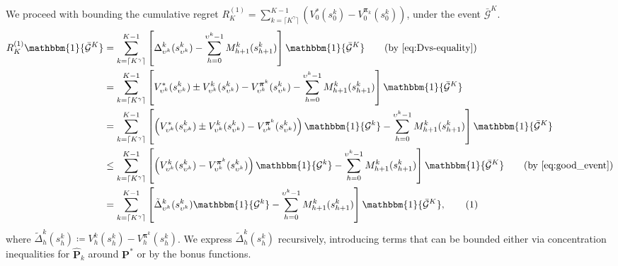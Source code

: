 \documentclass[11pt]{article}
\newcommand{\pii}{\boldsymbol{\pi}}
\newcommand{\pp}{\boldsymbol{P}}
\newcommand{\Dvs}{\Delta}
\newcommand{\Dvk}{\tilde{\Delta}}
\newcommand{\Dvsm}{M}
\newcommand\numberthis{\addtocounter{equation}{1}\tag{\theequation}}
\begin{document}
We proceed with bounding the cumulative regret $R_K^{(1)} = \sum_{k=\lceil K^\gamma\rceil}^{K-1} \left(V_0^{*}(s_0^k) - V_0^{\pii_k}(s_0^k)\right)$, under the event $\bar{\mathcal{G}}^K$.
\begin{align*}
    R_K^{(1)} \mathbbm{1}\{\bar{\mathcal{G}}^K\} 
    &= \sum_{k=\lceil K^\gamma\rceil}^{K-1}\left[\Dvs^k_{\upsilon^k}(s_{\upsilon^k}^k) - \sum_{h=0}^{{\upsilon^k}-1}\Dvsm^k_{h+1}(s_{h+1}^k)\right]\mathbbm{1}\{\bar{\mathcal{G}}^K\} \tag{by \eqref{eq:Dvs-equality}}\\
    &=\sum_{k=\lceil K^\gamma\rceil}^{K-1}\left[ V_{\upsilon^k}^{*}(s_{\upsilon^k}^k) \pm V_{\upsilon^k}^{k}(s_{\upsilon^k}^k) -V_{\upsilon^k}^{\pii^k}(s_{\upsilon^k}^k) - \sum_{h=0}^{{\upsilon^k}-1}\Dvsm^k_{h+1}(s_{h+1}^k)\right]\mathbbm{1}\{\bar{\mathcal{G}}^K\}\\
    &=\sum_{k=\lceil K^\gamma\rceil}^{K-1}\left[ \left(V_{\upsilon^k}^{*}(s_{\upsilon^k}^k) \pm V_{\upsilon^k}^{k}(s_{\upsilon^k}^k) -V_{\upsilon^k}^{\pii^k}(s_{\upsilon^k}^k)\right)\mathbbm{1}\{\mathcal{G}^k\} - \sum_{h=0}^{{\upsilon^k}-1}\Dvsm^k_{h+1}(s_{h+1}^k)\right]\mathbbm{1}\{\bar{\mathcal{G}}^K\}\\
    &\leq\sum_{k=\lceil K^\gamma\rceil}^{K-1}\left[ \left(V_{\upsilon^k}^{k}(s_{\upsilon^k}^k) -V_{\upsilon^k}^{\pii^k}(s_{\upsilon^k}^k)\right) \mathbbm{1}\{\mathcal{G}^k\} - \sum_{h=0}^{{\upsilon^k}-1}\Dvsm^k_{h+1}(s_{h+1}^k)\right]\mathbbm{1}\{\bar{\mathcal{G}}^K\}\tag{by \eqref{eq:good_event}}\\
    &=\sum_{k=\lceil K^\gamma\rceil}^{K-1}\left[ \Dvk_{\upsilon^k}^k(s_{\upsilon^k}^k) \mathbbm{1}\{\mathcal{G}^k\} - \sum_{h=0}^{{\upsilon^k}-1}\Dvsm^k_{h+1}(s_{h+1}^k)\right]\mathbbm{1}\{\bar{\mathcal{G}}^K\},\numberthis\label{eq:R_K_1_mart}
\end{align*}
where $\Dvk_h^k(s_h^k) \coloneqq V_h^{k}(s_h^k) - V_h^{\pii^k}(s_h^k)$. We express $\Dvk_h^k(s_h^k)$ recursively, introducing terms that can be bounded either via concentration inequalities for $\hat{\pp}_k$ around $\pp^*$ or by the bonus functions.
\end{document}
